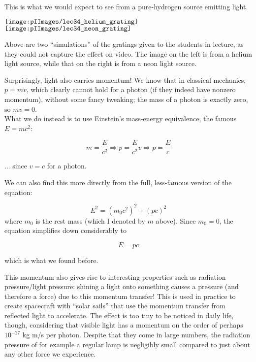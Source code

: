 
This is what we would expect to see from a pure-hydrogen source emitting light.

\begin{center}
$\vcenter{\hbox{\texttt{[image: \\pIImages/lec34\_helium\_grating]}}}$
$\vcenter{\hbox{\texttt{[image: \\pIImages/lec34\_neon\_grating]}}}$
\end{center}

Above are two ``simulations'' of the gratings given to the students in lecture, as they could not capture the effect on video. The image on the left is from a helium light source, while that on the right is from a neon light source.

Surprisingly, light also carries momentum! We know that in classical mechanics, $p = m v$, which clearly cannot hold for a photon (if they indeed have nonzero momentum), without some fancy tweaking; the mass of a photon is exactly zero, so $m v = 0$.\\
What we do instead is to use Einstein's mass-energy equivalence, the famous $E = m c^2$:

\begin{equation}
m = \frac{E}{c^2} \Rightarrow p = \frac{E}{c^2} v \Rightarrow p = \frac{E}{c}
\end{equation}

... since $v = c$ for a photon.

We can also find this more directly from the full, less-famous version of the equation:

\begin{equation}
E^2 = (m_0 c^2)^2 + (p c)^2
\end{equation}
where $m_0$ is the rest mass (which I denoted by $m$ above). Since $m_0 = 0$, the equation simplifies down considerably to

\begin{equation}
E = p c
\end{equation}

which is what we found before.

This momentum also gives rise to interesting properties such as radiation pressure/light pressure: shining a light onto something causes a pressure (and therefore a force) due to this momentum transfer! This is used in practice to create spacecraft with ``solar sails'' that use the momentum transfer from reflected light to accelerate. The effect is too tiny to be noticed in daily life, though, considering that visible light has a momentum on the order of perhaps $10^{-27}$ kg m/s per photon. Despite that they come in large numbers, the radiation pressure of for example a regular lamp is negligibly small compared to just about any other force we experience.

